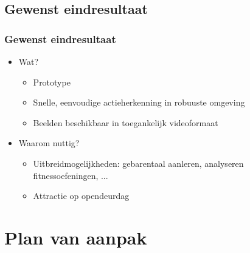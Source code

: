 \documentclass[handout]{beamer}
\begin{document}
	\subsection{Gewenst eindresultaat}	
	\begin{frame}
	\frametitle{Gewenst eindresultaat}
		\begin{itemize}
			\item<1- > Wat? 
				\begin{itemize}
				\item<1- > Prototype
				\item<1- > Snelle, eenvoudige actieherkenning in robuuste omgeving
				\item<1- > Beelden beschikbaar in toegankelijk videoformaat
				\end{itemize}
			\item<2- > Waarom nuttig?
				\begin{itemize}
				\item<2- > Uitbreidmogelijkheden: gebarentaal aanleren, analyseren fitnessoefeningen, ...
				\item<2- > Attractie op opendeurdag
				\end{itemize}
			
		\end{itemize}
	\end{frame}

	\section{Plan van aanpak}
\end{document}
